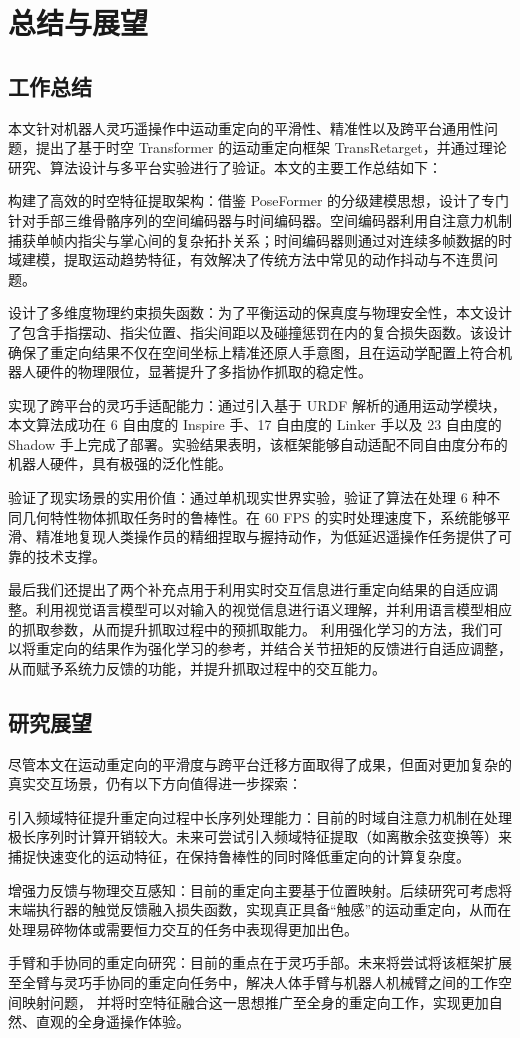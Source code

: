 \chapter{总结与展望}

\section{工作总结}
本文针对机器人灵巧遥操作中运动重定向的平滑性、精准性以及跨平台通用性问题，提出了基于时空 Transformer 的运动重定向框架 TransRetarget，并通过理论研究、算法设计与多平台实验进行了验证。本文的主要工作总结如下：

构建了高效的时空特征提取架构：借鉴 PoseFormer 的分级建模思想，设计了专门针对手部三维骨骼序列的空间编码器与时间编码器。空间编码器利用自注意力机制捕获单帧内指尖与掌心间的复杂拓扑关系；时间编码器则通过对连续多帧数据的时域建模，提取运动趋势特征，有效解决了传统方法中常见的动作抖动与不连贯问题。

设计了多维度物理约束损失函数：为了平衡运动的保真度与物理安全性，本文设计了包含手指摆动、指尖位置、指尖间距以及碰撞惩罚在内的复合损失函数。该设计确保了重定向结果不仅在空间坐标上精准还原人手意图，且在运动学配置上符合机器人硬件的物理限位，显著提升了多指协作抓取的稳定性。

实现了跨平台的灵巧手适配能力：通过引入基于 URDF 解析的通用运动学模块，本文算法成功在 6 自由度的 Inspire 手、17 自由度的 Linker 手以及 23 自由度的 Shadow 手上完成了部署。实验结果表明，该框架能够自动适配不同自由度分布的机器人硬件，具有极强的泛化性能。

验证了现实场景的实用价值：通过单机现实世界实验，验证了算法在处理 6 种不同几何特性物体抓取任务时的鲁棒性。在 60 FPS 的实时处理速度下，系统能够平滑、精准地复现人类操作员的精细捏取与握持动作，为低延迟遥操作任务提供了可靠的技术支撑。

最后我们还提出了两个补充点用于利用实时交互信息进行重定向结果的自适应调整。利用视觉语言模型可以对输入的视觉信息进行语义理解，并利用语言模型相应的抓取参数，从而提升抓取过程中的预抓取能力。
利用强化学习的方法，我们可以将重定向的结果作为强化学习的参考，并结合关节扭矩的反馈进行自适应调整，从而赋予系统力反馈的功能，并提升抓取过程中的交互能力。

\section{研究展望}
尽管本文在运动重定向的平滑度与跨平台迁移方面取得了成果，但面对更加复杂的真实交互场景，仍有以下方向值得进一步探索：

引入频域特征提升重定向过程中长序列处理能力：目前的时域自注意力机制在处理极长序列时计算开销较大。未来可尝试引入频域特征提取（如离散余弦变换等）来捕捉快速变化的运动特征，在保持鲁棒性的同时降低重定向的计算复杂度。

增强力反馈与物理交互感知：目前的重定向主要基于位置映射。后续研究可考虑将末端执行器的触觉反馈融入损失函数，实现真正具备“触感”的运动重定向，从而在处理易碎物体或需要恒力交互的任务中表现得更加出色。

手臂和手协同的重定向研究：目前的重点在于灵巧手部。未来将尝试将该框架扩展至全臂与灵巧手协同的重定向任务中，解决人体手臂与机器人机械臂之间的工作空间映射问题，
并将时空特征融合这一思想推广至全身的重定向工作，实现更加自然、直观的全身遥操作体验。

